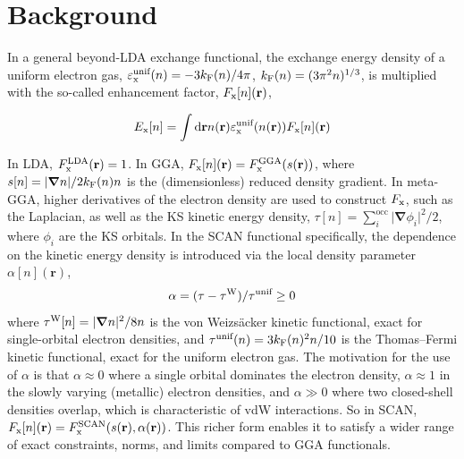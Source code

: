 \section{Background}

In a general beyond-LDA exchange functional, the exchange energy density of a uniform electron gas, $\varepsilon^\text{unif}_\text x(n)=-3k_\mathrm F(n)/4\pi$, $k_\text F(n)=(3\pi^2n)^{1/3}$, is multiplied with the so-called enhancement factor, $F_\text x[n](\mathbf r)$,

$$
E_\text x[n]=\int\mathrm d\mathbf rn(\mathbf r)\varepsilon^\text{unif}_\text x(n(\mathbf r))F_\text x[n](\mathbf r)
$$

In LDA, $F^\text{LDA}_\text x(\mathbf r)=1$.
In GGA, $F_\text x[n](\mathbf r)=F^\text{GGA}_\text x(s(\mathbf r))$, where $s[n]=\lvert\boldsymbol\nabla n\rvert/2k_\text F(n)n$ is the (dimensionless) reduced density gradient.
In meta-GGA, higher derivatives of the electron density are used to construct $F_\text x$, such as the Laplacian, as well as the KS kinetic energy density, $\tau[n]=\sum_i^\text{occ}\lvert\boldsymbol\nabla\phi_i\rvert^2/2$, where $\phi_i$ are the KS orbitals.
In the SCAN functional specifically, the dependence on the kinetic energy density is introduced via the local density parameter $\alpha[n](\mathbf r)$,
$$
\alpha=(\tau-\tau^\text W)/\tau^\text{unif}\geq0
$$
where $\tau^\text W[n]=\lvert\boldsymbol\nabla n\rvert^2/8n$ is the von Weizsäcker kinetic functional, exact for single-orbital electron densities, and $\tau^\text{unif}(n)=3k_\text F(n)^2n/10$ is the Thomas--Fermi kinetic functional, exact for the uniform electron gas.
The motivation for the use of $\alpha$ is that $\alpha\approx0$ where a single orbital dominates the electron density, $\alpha\approx1$ in the slowly varying (metallic) electron densities, and $\alpha\gg0$ where two closed-shell densities overlap, which is characteristic of vdW interactions.
So in SCAN, $F_\text x[n](\mathbf r)=F_\text x^\text{SCAN}(s(\mathbf r), \alpha(\mathbf r))$.
This richer form enables it to satisfy a wider range of exact constraints, norms, and limits compared to GGA functionals.

